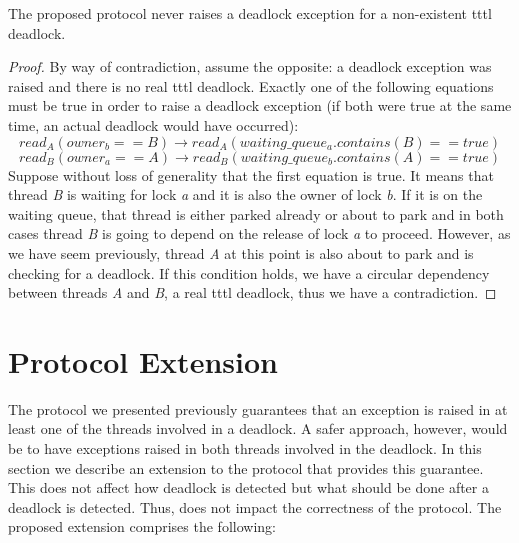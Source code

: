 \begin{Lem}
The proposed protocol never raises a deadlock exception for a non-existent \ac{tttl} deadlock.
\end{Lem}
\begin{proof}
By way of contradiction, assume the opposite: a deadlock exception was raised and there is no real \ac{tttl} deadlock. Exactly one of the following equations must be true in order to raise a deadlock exception (if both were true at the same time, an actual deadlock would have occurred):
\begin{equation}
read_{A}(owner_{b} == B) \rightarrow read_{A}(waiting\_queue_{a}.contains(B) == true)
\end{equation}
\begin{equation}
read_{B}(owner_{a} == A) \rightarrow read_{B}(waiting\_queue_{b}.contains(A) == true)
\end{equation}
Suppose without loss of generality that the first equation is true.
It means that thread \emph{B} is waiting for lock \emph{a} and it is also the owner of lock \emph{b}.
If it is on the waiting queue, that thread is either parked already or about to park
and in both cases thread \emph{B} is going to depend on the release of lock \emph{a} to proceed.
However, as we have seem previously, thread \emph{A} at this point is also about to park and is checking for a deadlock.
If this condition holds, we have a circular dependency between threads \emph{A} and \emph{B}, a real \ac{tttl} deadlock, thus we have a contradiction.
\end{proof}

\section{Protocol Extension}

The protocol we presented previously guarantees that an exception is raised in at least one of the threads involved in a deadlock. A safer approach, however, would be to have exceptions raised in both threads involved in the deadlock. In this section we describe an extension to the protocol that provides this guarantee. This does not affect how deadlock is detected but what should be done after a deadlock is detected. Thus, does not impact the correctness of the protocol. The proposed extension comprises the following:

